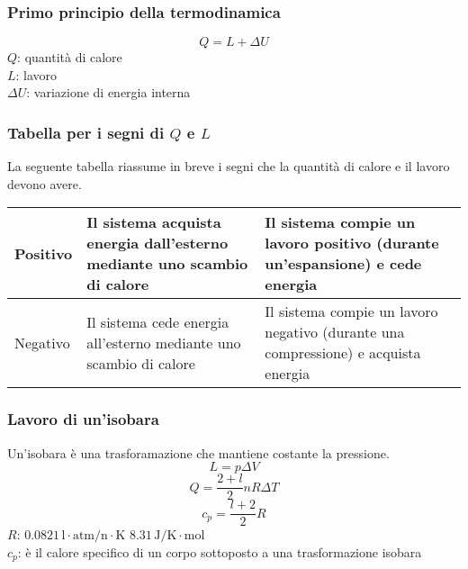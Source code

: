 \subsubsection{Primo principio della termodinamica}
\begin{equation*}
  Q = L+\Delta U
\end{equation*}
$Q$: quantità di calore\\
$L$: lavoro\\
$\Delta U$: variazione di energia interna

\subsubsection{Tabella per i segni di $Q$ e $L$}
La seguente tabella riassume in breve i segni che la quantità di calore e il lavoro devono avere.
\tablelasttail{\bottomrule}
\begin{center}
  \begin{xtabular}{M{2cm} M{2cm} M{2cm}}
    Positivo & Il sistema acquista energia dall'esterno mediante uno scambio di calore &
    Il sistema compie un lavoro positivo (durante un'espansione) e cede energia\\ \midrule
    Negativo & Il sistema cede energia all'esterno mediante uno scambio di calore &
    Il sistema compie un lavoro negativo (durante una compressione) e acquista energia\\
  \end{xtabular}
\end{center}
\subsubsection{Lavoro di un'isobara}
Un'isobara è una trasforamazione che mantiene costante la pressione.
\begin{equation*}
  L = p\Delta V
\end{equation*}
\begin{equation*}
  Q = \frac{2+l}{2}nR\Delta T
\end{equation*}
\begin{equation*}
  c_p = \frac{l+2}{2}R
\end{equation*}
\hyperref[tab:R]{$R$}: $0.0821\,\text{l}\cdot\text{atm/n}\cdot\text{K}$
$8.31\,\text{J/K}\cdot\text{mol}$\\
$c_p$: è il calore specifico di un corpo sottoposto a una trasformazione isobara

